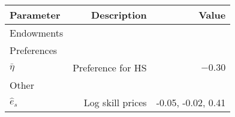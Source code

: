\begin{tabular}{lrr}
\hline
Parameter & Description  & Value  \\
\hline
Endowments &   &   \\
Preferences &   &   \\
$\bar{\eta}$ & Preference for HS  & $-0.30$  \\
Other &   &   \\
$\hat{e}_{s}$ & Log skill prices  & -0.05, -0.02, 0.41  \\
\hline
\end{tabular}%
